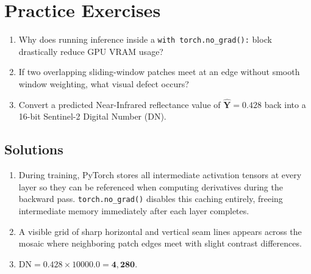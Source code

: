 \section{Practice Exercises}
\begin{enumerate}
    \item Why does running inference inside a \texttt{with torch.no\_grad():} block drastically reduce GPU VRAM usage?
    \item If two overlapping sliding-window patches meet at an edge without smooth window weighting, what visual defect occurs?
    \item Convert a predicted Near-Infrared reflectance value of $\hat{\mathbf{Y}} = 0.428$ back into a 16-bit Sentinel-2 Digital Number (DN).
\end{enumerate}

\subsection*{Solutions}
\begin{enumerate}
    \item During training, PyTorch stores all intermediate activation tensors at every layer so they can be referenced when computing derivatives during the backward pass. \texttt{torch.no\_grad()} disables this caching entirely, freeing intermediate memory immediately after each layer completes.
    \item A visible grid of sharp horizontal and vertical seam lines appears across the mosaic where neighboring patch edges meet with slight contrast differences.
    \item $\text{DN} = 0.428 \times 10000.0 = \mathbf{4{,}280}$.
\end{enumerate}
